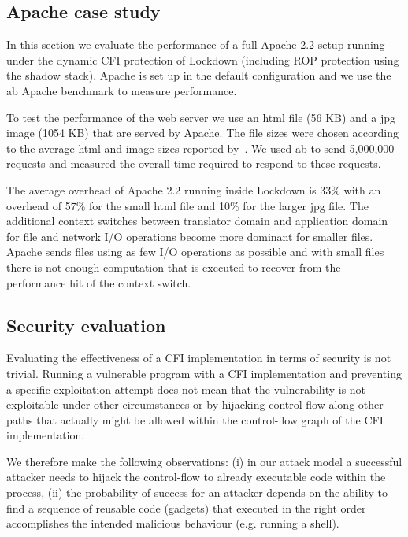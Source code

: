 \documentclass{acm_proc_article-sp}
\begin{document}
\subsection{Apache case study}


In this section we evaluate the performance of a full Apache 2.2 setup running
under the dynamic CFI protection of Lockdown (including ROP protection using the
shadow stack). Apache is set up in the default configuration and we use the ab
Apache benchmark to measure performance.

To test the performance of the web server we use an html file (56 KB)
and a jpg image (1054 KB) that are served by Apache. The file sizes were chosen
according to the average html and image sizes reported by~\cite{httparchive}.
We used ab to send 5,000,000 requests and measured the overall time required
to respond to these requests. 





The average overhead of Apache 2.2 running inside Lockdown is 33\% with an
overhead of 57\% for the small html file and 10\% for the larger jpg file. The
additional context switches between translator domain and application domain for
file and network I/O operations become more dominant for smaller files. Apache
sends files using as few I/O operations as possible and with small files there
is not enough computation that is executed to recover from the performance hit
of the context switch.


\subsection{Security evaluation}


Evaluating the effectiveness of a CFI implementation in terms of security is not
trivial. Running a vulnerable program with a CFI implementation and preventing a
specific exploitation attempt does not mean that the vulnerability is not
exploitable under other circumstances or by hijacking control-flow along other
paths that actually might be allowed within the control-flow graph of the CFI
implementation.

We therefore make the following observations: (i) in our attack model a
successful attacker needs to hijack the control-flow to already executable code
within the process, (ii) the probability of success for an attacker depends on
the ability to find a sequence of reusable code (gadgets) that executed in the
right order accomplishes the intended malicious behaviour (e.g. running a shell).
\end{document}
